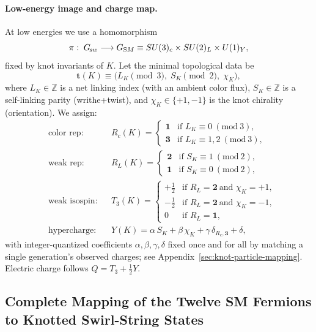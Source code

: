 \documentclass[smallextended]{svjour3}       %
\begin{document}
	\paragraph{Low-energy image and charge map.}
	At low energies we use a homomorphism
	\[
		\pi:\; G_{\!sw}\longrightarrow G_{\textrm SM}\equiv SU(3)_c\times SU(2)_L\times U(1)_Y,
	\]
	fixed by knot invariants of \(K\).
	Let the minimal topological data be
	\[
		\mathbf{t}(K)\equiv\big(L_K\!\!\!\!\pmod{3},\; S_K\!\!\!\!\pmod{2},\; \chi_K\big),
	\]
	where \(L_K\in\mathbb{Z}\) is a net linking index (with an ambient color flux), \(S_K\in\mathbb{Z}\) is a self-linking parity (writhe+twist), and \(\chi_K\in\{+1,-1\}\) is the knot chirality (orientation).
	We assign:
	\begin{align}
		&\text{color rep:} &&
		R_c(K)=
		\begin{cases}
			\mathbf{1} & \text{if } L_K\equiv 0\ (\mathrm{mod}\ 3),\\
			\mathbf{3} & \text{if } L_K\equiv 1,2\ (\mathrm{mod}\ 3),
		\end{cases}
		\\[2pt]
		&\text{weak rep:} &&
		R_L(K)=
		\begin{cases}
			\mathbf{2} & \text{if } S_K\equiv 1\ (\mathrm{mod}\ 2),\\
			\mathbf{1} & \text{if } S_K\equiv 0\ (\mathrm{mod}\ 2),
		\end{cases}
		\\[2pt]
		&\text{weak isospin:} &&
		T_3(K)=
		\begin{cases}
			+\tfrac{1}{2} & \text{if } R_L=\mathbf{2}\ \text{and }\chi_K=+1,\\
			-\tfrac{1}{2} & \text{if } R_L=\mathbf{2}\ \text{and }\chi_K=-1,\\
			0 & \text{if } R_L=\mathbf{1},
		\end{cases}
		\\[2pt]
		&\text{hypercharge:} &&
		Y(K)=\alpha\,S_K+\beta\,\chi_K+\gamma\,\delta_{R_c,\mathbf{3}}+\delta,
		\label{eq:Y-map}
	\end{align}
	with integer-quantized coefficients \(\alpha,\beta,\gamma, \delta\) fixed once and for all by matching a single generation’s observed charges; see Appendix~\ref{sec:knot-particle-mapping}.
	Electric charge follows \(Q=T_3+\tfrac12 Y\).


\subsection*{Complete Mapping of the Twelve SM Fermions to Knotted Swirl-String States}
\end{document}
